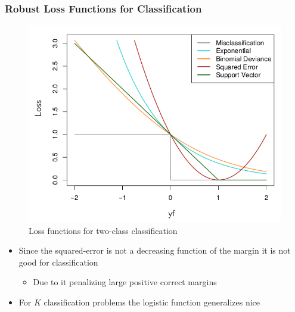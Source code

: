 \documentclass[11pt]{article}
\begin{document}
\subsubsection{Robust Loss Functions for Classification}
\label{sec:org92f038b}
\begin{figure}[htbp]
\centering
\includegraphics[width=.9\linewidth]{Boosting and Additive Trees/screenshot_2018-10-22_08-47-22.png}
\caption{\label{fig:org3037dfd}
Loss functions for two-class classification}
\end{figure}

\begin{itemize}
\item Since the squared-error is not a decreasing function of the margin it is not good for classification
\begin{itemize}
\item Due to it penalizing large positive correct margins
\end{itemize}

\item For \(K\) classification problems the logistic function generalizes nice
\end{itemize}
\end{document}

